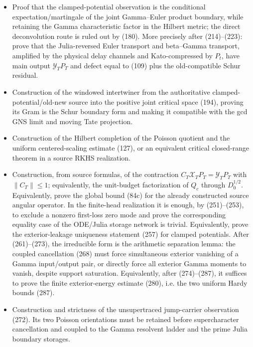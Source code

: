 \documentclass[11pt]{article}
\begin{document}
\begin{itemize}
\item Proof that the clamped-potential observation is the conditional
      expectation/martingale of the joint Gamma--Euler product boundary,
      while retaining the Gamma characteristic factor in the Hilbert metric;
      the direct deconvolution route is ruled out by (180).
      More precisely after (214)--(223): prove that the Julia-reversed Euler
      transport and beta--Gamma transport, amplified by the physical delay
      channels and Kato-compressed by $P_t$, have main output
      $\mathcal Y_TP_T$ and defect equal to (109) plus the old-compatible
      Schur residual.
\item Construction of the windowed intertwiner from the authoritative
      clamped-potential/old-new source into the positive joint critical space
      (194), proving its Gram is the Schur boundary form and making it
      compatible with the gcd GNS limit and moving Tate projection.
\item Construction of the Hilbert completion of the Poisson quotient and the
      uniform centered-scaling estimate (127), or an equivalent critical
      closed-range theorem in a source RKHS realization.
\item Construction, from source formulas, of the contraction
      $C_T\mathcal X_TP_T=\mathcal Y_TP_T$ with $\|C_T\|\le1$; equivalently,
      the unit-budget factorization of $Q_c$ through $D_0^{1/2}$.
      Equivalently, prove the global bound (84c) for the already constructed
      source angular operator.
      In the finite-head realization it is enough, by (251)--(253), to exclude
      a nonzero first-loss zero mode and prove the corresponding equality case
      of the ODE/Julia storage network is trivial.  Equivalently, prove the
      exterior-leakage uniqueness statement (257) for clamped potentials.
      After (261)--(273), the irreducible form is the arithmetic separation
      lemma: the coupled cancellation (268) must force simultaneous exterior
      vanishing of a Gamma input/output pair, or directly force all exterior
      Gamma moments to vanish, despite support saturation.  Equivalently,
      after (274)--(287), it suffices to prove the finite exterior-energy
      estimate (280), i.e. the two uniform Hardy bounds (287).
\item Construction and strictness of the unsupertraced jump-carrier
      observation (272).  Its two Poisson orientations must be retained
      before supercharacter cancellation and coupled to the Gamma resolvent
      ladder and the prime Julia boundary storages.

\end{itemize}
\end{document}
